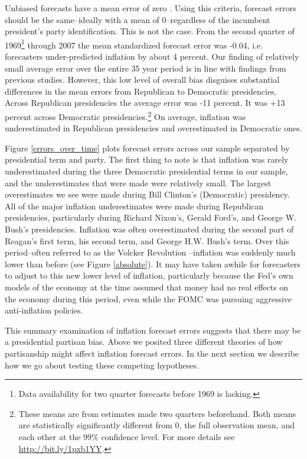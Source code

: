 \documentclass[a4paper]{article}
\begin{document}
Unbiased forecasts have a mean error of zero \citep[5]{Bruck2006}. Using this criteria, forecast errors should be the same--ideally with a mean of 0--regardless of the incumbent president's party identification. This is not the case. From the second quarter of 1969\footnote{Data availability for two quarter forecasts before 1969 is lacking.} through 2007 the mean standardized forecast error was -0.04, i.e. forecasters under-predicted inflation by about 4 percent. Our finding of relatively small average error over the entire 35 year period is in line with findings from previous studies. However, this low level of overall bias disguises substantial differences in the mean errors from Republican to Democratic presidencies. Across Republican presidencies the average error was -11 percent. It was +13 percent across Democratic presidencies.\footnote{These means are from estimates made two quarters beforehand. Both means are statistically significantly different from 0, the full observation mean, and each other at the 99\% confidence level. For more details see \url{http://bit.ly/1pxb1YY}.} On average, inflation was underestimated in Republican presidencies and overestimated in Democratic ones.

Figure \ref{errors_over_time} plots forecast errors across our sample separated by presidential term and party. The first thing to note is that inflation was rarely underestimated during the three Democratic presidential terms in our sample, and the underestimates that were made were relatively small. The largest overestimates we see were made during Bill Clinton's (Democratic) presidency. All of the major inflation underestimates were made during Republican presidencies, particularly during Richard Nixon's, Gerald Ford's, and George W. Bush's presidencies. Inflation was often overestimated during the second part of Reagan's first term, his second term, and George H.W. Bush's term. Over this period--often referred to as the Volcker Revolution \citep{Bartels1985}--inflation was suddenly much lower than before (see Figure \ref{absolute}). It may have taken awhile for forecasters to adjust to this new lower level of inflation, particularly because the Fed's own models of the economy at the time assumed that money had no real effects on the economy during this period, even while the FOMC was pursuing aggressive anti-inflation policies.

This summary examination of inflation forecast errors suggests that there may be a presidential partisan bias. Above we posited three different theories of how partisanship might affect inflation forecast errors. In the next section we describe how we go about testing these competing hypotheses.
\end{document}
